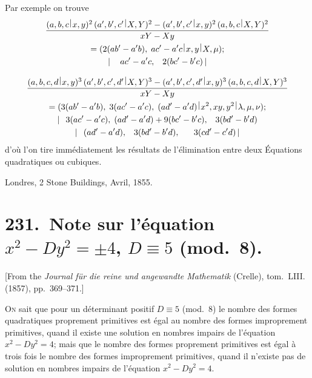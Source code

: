 \documentclass[11pt,a4paper]{book}
\theoremstyle{plain}
\newcommand{\wrule}{\hspace{-0.1em}\mid\hspace{-0.1em}}
\begin{document}
Par exemple on trouve
\begin{multline*}
\frac{(a,b,c\,\raisebox{0.5ex}{$\wrule$}\,x,y)^2\,(a',b',c'\,\raisebox{0.5ex}{$\wrule$}\,X,Y)^2-(a',b',c'\,\raisebox{0.5ex}{$\wrule$}\,x,y)^2\,(a,b,c\,\raisebox{0.5ex}{$\wrule$}\,X,Y)^2}{xY-Xy}\\
=(2(ab'-a'b),\; ac'-a'c\,\raisebox{0.5ex}{$\wrule$}\,x,y\,\raisebox{0.5ex}{$\wrule$}\,X,\mu);\\
|\,\quad ac'-a'c,\;\;\; 2(bc'-b'c)\,|
\end{multline*}

\begin{multline*}
\frac{(a,b,c,d\,\raisebox{0.5ex}{$\wrule$}\,x,y)^3\,(a',b',c',d'\,\raisebox{0.5ex}{$\wrule$}\,X,Y)^3-(a',b',c',d'\,\raisebox{0.5ex}{$\wrule$}\,x,y)^3\,(a,b,c,d\,\raisebox{0.5ex}{$\wrule$}\,X,Y)^3}{xY-Xy}\\
=(3(ab'-a'b),\; 3(ac'-a'c),\; (ad'-a'd)\,\raisebox{0.5ex}{$\wrule$}\,x^2,xy,y^2\,\raisebox{0.5ex}{$\wrule$}\,\lambda,\mu,\nu);\\
|\,\;\; 3(ac'-a'c),\; (ad'-a'd)+9(bc'-b'c),\;\;\; 3(bd'-b'd)\\
|\,\;\; (ad'-a'd),\;\;\; 3(bd'-b'd),\;\;\;\;\;\; 3(cd'-c'd)\,|
\end{multline*}
d'o\`{u} l'on tire imm\'{e}diatement les r\'{e}sultats de l'\'{e}limination entre deux \'{E}quations quadratiques ou cubiques.

\begin{flushright}
Londres, 2 Stone Buildings, Avril, 1855.
\end{flushright}
\newpage

\chapter[Note sur l'\'{e}quation $x^2-Dy^2=\pm4$, $D\equiv5$ (mod.~8)]{231.\ Note sur l'\'{e}quation $x^2-Dy^2=\pm4$, $D\equiv5$ (mod.~8).}
\label{paper231}

\begin{center}
\small
[From the \textit{Journal f\"{u}r die reine und angewandte Mathematik} (Crelle), tom.~LIII. (1857), pp.~369--371.]
\end{center}

\bigskip

\textsc{On} sait que pour un d\'{e}terminant positif $D\equiv5$ (mod.~8) le nombre des formes quadratiques proprement primitives est \'{e}gal au nombre des formes improprement primitives, quand il existe une solution en nombres impairs de l'\'{e}quation $x^2-Dy^2=4$; mais que le nombre des formes proprement primitives est \'{e}gal \`{a} trois fois le nombre des formes improprement primitives, quand il n'existe pas de solution en nombres impairs de l'\'{e}quation $x^2-Dy^2=4$.
\end{document}
